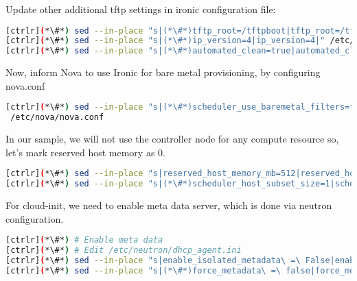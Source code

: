 	Update other additional tftp settings in ironic configuration file:


\begin{lstlisting}[language=bash,keywords={}]
[ctrlr](*\#*) sed --in-place "s|(*\#*)tftp_root=/tftpboot|tftp_root=/tftpboot|" /etc/ironic/ironic.conf
[ctrlr](*\#*) sed --in-place "s|(*\#*)ip_version=4|ip_version=4|" /etc/ironic/ironic.conf
[ctrlr](*\#*) sed --in-place "s|(*\#*)automated_clean=true|automated_clean=false|" /etc/ironic/ironic.conf
\end{lstlisting} 

	Now, inform Nova to use Ironic for bare metal provisioning, by configuring nova.conf


\begin{lstlisting}[language=bash,keywords={}]
[ctrlr](*\#*) sed --in-place "s|(*\#*)scheduler_use_baremetal_filters=false|scheduler_use_baremetal_filters=true|" \
 /etc/nova/nova.conf
\end{lstlisting} 

	In our sample, we will not use the controller node for any compute resource so, let's mark reserved host memory as 0.


\begin{lstlisting}[language=bash,keywords={}]
[ctrlr](*\#*) sed --in-place "s|reserved_host_memory_mb=512|reserved_host_memory_mb=0|" /etc/nova/nova.conf
[ctrlr](*\#*) sed --in-place "s|(*\#*)scheduler_host_subset_size=1|scheduler_host_subset_size=9999999|" /etc/nova/nova.conf
\end{lstlisting} 

	For cloud-init, we need to enable meta data server, which is done via neutron configuration.


\begin{lstlisting}[language=bash,keywords={}]
[ctrlr](*\#*) # Enable meta data
[ctrlr](*\#*) # Edit /etc/neutron/dhcp_agent.ini
[ctrlr](*\#*) sed --in-place "s|enable_isolated_metadata\ =\ False|enable_isolated_metadata\ =\ True|" /etc/neutron/dhcp_agent.ini
[ctrlr](*\#*) sed --in-place "s|(*\#*)force_metadata\ =\ false|force_metadata\ =\ True|" \ /etc/neutron/dhcp_agent.ini
\end{lstlisting} 

